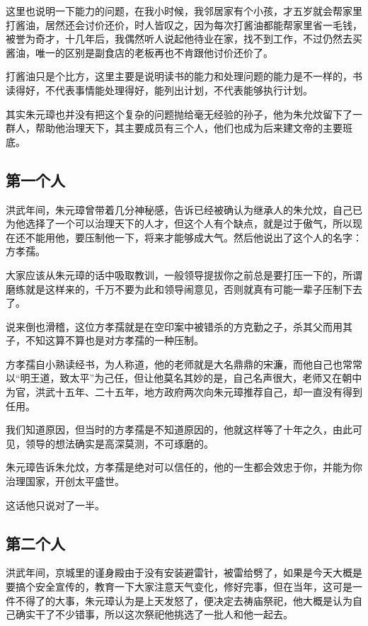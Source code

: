 \begin{multicols}{\theparacolNo}
		这里也说明一下能力的问题，在我小时候，我邻居家有个小孩，才五岁就会帮家里打酱油，居然还会讨价还价，时人皆叹之，因为每次打酱油都能帮家里省一毛钱，被誉为奇才，十几年后，我偶然听人说起他待业在家，找不到工作，不过仍然去买酱油，唯一的区别是副食店的老板再也不肯跟他讨价还价了。

		打酱油只是个比方，这里主要是说明读书的能力和处理问题的能力是不一样的，书读得好，不代表事情能处理得好，能列出计划，不代表能够执行计划。

		其实朱元璋也并没有把这个复杂的问题抛给毫无经验的孙子，他为朱允炆留下了一群人，帮助他治理天下，其主要成员有三个人，他们也成为后来建文帝的主要班底。

		\subsection{第一个人}
		洪武年间，朱元璋曾带着几分神秘感，告诉已经被确认为继承人的朱允炆，自己已为他选择了一个可以治理天下的人才，但这个人有个缺点，就是过于傲气，所以现在还不能用他，要压制他一下，将来才能够成大气。然后他说出了这个人的名字：方孝孺。

		大家应该从朱元璋的话中吸取教训，一般领导提拔你之前总是要打压一下的，所谓磨练就是这样来的，千万不要为此和领导闹意见，否则就真有可能一辈子压制下去了。

		说来倒也滑稽，这位方孝孺就是在空印案中被错杀的方克勤之子，杀其父而用其子，不知这算不算也是对方孝孺的一种压制。

		方孝孺自小熟读经书，为人称道，他的老师就是大名鼎鼎的宋濂，而他自己也常常以“明王道，致太平”为己任，但让他莫名其妙的是，自己名声很大，老师又在朝中为官，洪武十五年、二十五年，地方政府两次向朱元璋推荐自己，却一直没有得到任用。

		我们知道原因，但当时的方孝孺是不知道原因的，他就这样等了十年之久，由此可见，领导的想法确实是高深莫测，不可琢磨的。

		朱元璋告诉朱允炆，方孝孺是绝对可以信任的，他的一生都会效忠于你，并能为你治理国家，开创太平盛世。

		这话他只说对了一半。

		\subsection{第二个人}
		洪武年间，京城里的谨身殿由于没有安装避雷针，被雷给劈了，如果是今天大概是要搞个安全宣传的，教育一下大家注意天气变化，修好完事，但在当年，这可是一件不得了的大事，朱元璋认为是上天发怒了，便决定去祷庙祭祀，他大概是认为自己确实干了不少错事，所以这次祭祀他挑选了一批人和他一起去。


\end{multicols}
